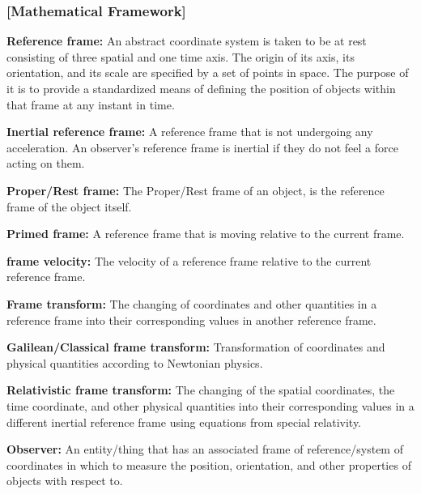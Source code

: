 
\subsubsection{[Mathematical Framework]}%

\noindent \hypertarget{def-Reference-frame}{\textbf{Reference frame:}}
An abstract coordinate system is taken to be at rest consisting of three spatial and one time axis. The origin of its axis, its orientation, and its scale are specified by a set of points in space. The purpose of it is to provide a standardized means of defining the position of objects within that frame at any instant in time.

\noindent \hypertarget{def-Inertial-reference-frame}{\textbf{Inertial reference frame:}}
A reference frame that is not undergoing any acceleration. An observer's reference frame is inertial if they do not feel a force acting on them.

\noindent \hypertarget{def-proper-frame}{\textbf{Proper/Rest frame:}}
The Proper/Rest frame of an object, is the reference frame of the object itself.

\noindent \hypertarget{def-Primed-Frame}{\textbf{Primed frame:}}
A reference frame that is moving relative to the current frame.

\noindent \hypertarget{def-frame-velocity}{\textbf{frame velocity:}}
The velocity of a reference frame relative to the current reference frame.

\noindent \hypertarget{def-transform}{\textbf{Frame transform:}}
The changing of coordinates and other quantities in a reference frame into their corresponding values in another reference frame.

\noindent \hypertarget{def-galilean-transform}{\textbf{Galilean/Classical frame transform:}}
Transformation of coordinates and physical quantities according to Newtonian physics.

\noindent \hypertarget{def-lorentz-transform}{\textbf{Relativistic frame transform:}}
The changing of the spatial coordinates, the time coordinate, and other physical quantities into their corresponding values in a different inertial reference frame using equations from special relativity.

\noindent \hypertarget{def-observer}{\textbf{Observer:}}
An entity/thing that has an associated frame of reference/system of coordinates in which to measure the position, orientation, and other properties of objects with respect to.

